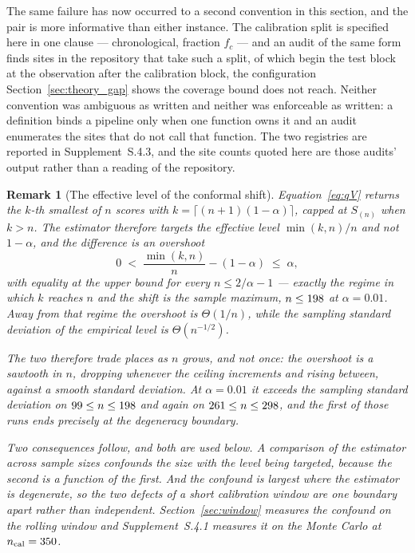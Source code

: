 \documentclass[preprint,11pt,authoryear]{elsarticle}
\newtheorem{remark}[theorem]{Remark}
\newcommand{\1}{\boldsymbol{1}}
\begin{document}
The same failure has now occurred to a second convention in this section, and
the pair is more informative than either instance. The calibration split is
specified here in one clause --- chronological, fraction $f_c$ --- and an audit
of the same form finds \nSplitSites{} sites in the repository that take such a
split, \nSplitContiguous{} of which begin the test block at the observation
after the calibration block, the configuration
Section~\ref{sec:theory_gap} shows the coverage bound does not reach. Neither
convention was ambiguous as written and neither was enforceable as written: a
definition binds a pipeline only when one function owns it and an audit
enumerates the sites that do not call that function. The two registries are
reported in Supplement~S.4.3, and the site counts quoted here are those audits'
output rather than a reading of the repository.

\begin{remark}[The effective level of the conformal shift]
	\label{rem:effective_level}
	Equation~\eqref{eq:qV} returns the $k$-th smallest of $n$ scores with
	$k = \lceil (n+1)(1-\alpha)\rceil$, capped at $S_{(n)}$ when $k > n$. The
	estimator therefore targets the \emph{effective level} $\min(k,n)/n$ and not
	$1-\alpha$, and the difference is an overshoot
	\[
		0 \;<\; \frac{\min(k,n)}{n} - (1-\alpha) \;\le\; \alpha ,
	\]
	with equality at the upper bound for every $n \le 2/\alpha - 1$ --- exactly
	the regime in which $k$ reaches $n$ and the shift is the sample maximum,
	$n \le 198$ at $\alpha = 0.01$. Away from that regime the overshoot
	is $\Theta(1/n)$, while the sampling standard deviation of the empirical
	level is $\Theta(n^{-1/2})$.

	The two therefore trade places as $n$ grows, and not once: the overshoot is a
	sawtooth in $n$, dropping whenever the ceiling increments and rising between,
	against a smooth standard deviation. At $\alpha = 0.01$ it exceeds the
	sampling standard deviation on $99 \le n \le 198$ and
	again on $261 \le n \le 298$, and the first of those
	runs ends precisely at the degeneracy boundary.

	Two consequences follow, and both are used below. A comparison of the
	estimator across sample sizes confounds the size with the level being
	targeted, because the second is a function of the first. And the confound is
	largest where the estimator is degenerate, so the two defects of a short
	calibration window are one boundary apart rather than independent. Section~\ref{sec:window}
	measures the confound on the rolling window and Supplement~S.4.1 measures it
	on the Monte Carlo at $n_{\mathrm{cal}} = 350$.
\end{remark}
\end{document}
